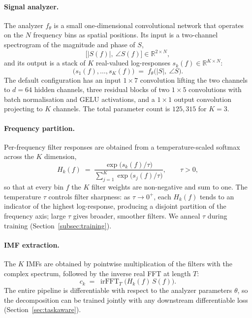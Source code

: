 \documentclass[journal]{IEEEtran}
\theoremstyle{remark}
\newcommand{\R}{\mathbb{R}}
\DeclareMathOperator{\irFFT}{irFFT}
\begin{document}
\paragraph{Signal analyzer.}
The analyzer $f_{\theta}$ is a small one-dimensional convolutional
network that operates on the $N$ frequency bins as spatial positions.
Its input is a two-channel spectrogram of the magnitude and phase of
$S$,
\begin{equation}
\bigl[\lvert S(f)\rvert,\ \angle S(f)\bigr] \in \R^{2 \times N} ,
\end{equation}
and its output is a stack of $K$ real-valued log-responses
$s_{k}(f) \in \R^{K \times N}$:
\begin{equation}
\bigl(s_{1}(f), \ldots, s_{K}(f)\bigr) \;=\; f_{\theta}\!\bigl(
\lvert S\rvert,\ \angle S\bigr) .
\label{eq:analyzer}
\end{equation}
The default configuration has an input $1\times 7$ convolution lifting
the two channels to $d=64$ hidden channels, three residual blocks of
two $1\times 5$ convolutions with batch normalisation and GELU
activations, and a $1\times 1$ output convolution projecting to $K$
channels. The total parameter count is $125{,}315$ for $K=3$.

\paragraph{Frequency partition.}
Per-frequency filter responses are obtained from a temperature-scaled
softmax across the $K$ dimension,
\begin{equation}
H_{k}(f) \;=\;
\frac{\exp\!\bigl(s_{k}(f)/\tau\bigr)}%
{\sum_{j=1}^{K}\exp\!\bigl(s_{j}(f)/\tau\bigr)} ,
\qquad \tau > 0 ,
\label{eq:softmax-partition}
\end{equation}
so that at every bin $f$ the $K$ filter weights are non-negative and
sum to one. The temperature $\tau$ controls filter sharpness: as
$\tau \to 0^{+}$, each $H_{k}(f)$ tends to an indicator of the highest
log-response, producing a disjoint partition of the frequency axis;
large $\tau$ gives broader, smoother filters. We anneal $\tau$ during
training (Section~\ref{subsec:training}).

\paragraph{IMF extraction.}
The $K$ IMFs are obtained by pointwise multiplication of the filters
with the complex spectrum, followed by the inverse real FFT at length
$T$:
\begin{equation}
c_{k} \;=\; \irFFT_{T}\!\bigl(H_{k}(f)\,S(f)\bigr) .
\label{eq:imf}
\end{equation}
The entire pipeline is differentiable with respect to the analyzer
parameters $\theta$, so the decomposition can be trained jointly with
any downstream differentiable loss (Section~\ref{sec:taskaware}).
\end{document}
